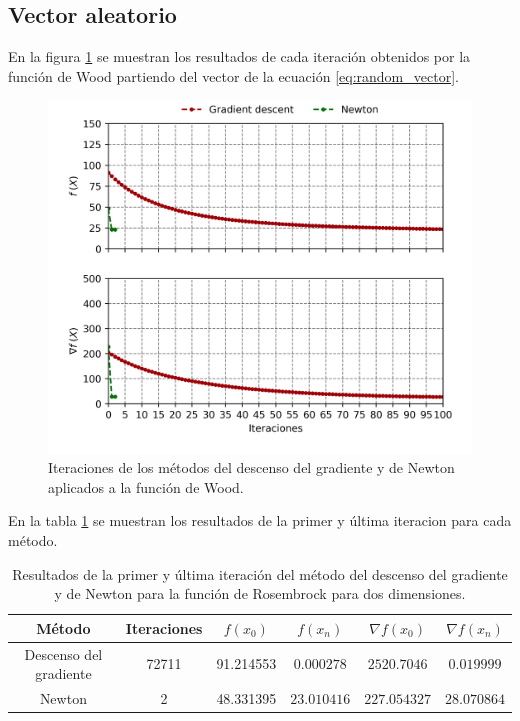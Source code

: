 \subsection{Vector aleatorio}

En la figura \ref{fig:wood_random} se muestran los resultados de cada iteración obtenidos por la función de Wood partiendo del vector de la ecuación \ref{eq:random_vector}.

\begin{figure}[H]
    \centering
    \includegraphics[width=12cm]{Graphics/Problema_2/wood_4_random.png}
    \caption{Iteraciones de los métodos del descenso del gradiente y de Newton aplicados a la función de Wood.}
    \label{fig:wood_random}
\end{figure}

En la tabla \ref{table:wood_random} se muestran los resultados de la primer y última iteracion para cada método.

\begin{table}[H]
    \centering
    \begin{tabular}{cccccc} \hline
        Método                 & Iteraciones & $f(x_0)$  & $f(x_n)$    & $\nabla f(x_0)$ & $\nabla f(x_n) $ \\ \hline
        Descenso del gradiente & 72711       & 91.214553 & $0.000278$  & $2520.7046$     & $0.019999$       \\
        Newton                 & 2           & 48.331395 & $23.010416$ & $227.054327$    & $28.070864$      \\ \hline
    \end{tabular}
    \caption{Resultados de la primer y última iteración del método del descenso del gradiente y de Newton para la función de Rosembrock para dos dimensiones.}
    \label{table:wood_random}
\end{table}

